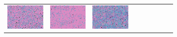 \documentclass{ipol}
\begin{document}
\begin{figure}[ht]
\begin{subfigure}[t]{\linewidth}
\begin{tabular}{ccccccccc}
                \includegraphics[width=\s]{images/tower/AHD/bid_n5_64_grids.png}&
                \includegraphics[width=\s]{images/tower/DCB/bid_n5_64_grids.png}&
                \includegraphics[width=\s]{images/tower/DHT/bid_n5_64_grids.png}&

\end{tabular}
\end{subfigure}
\end{figure}
\end{document}
